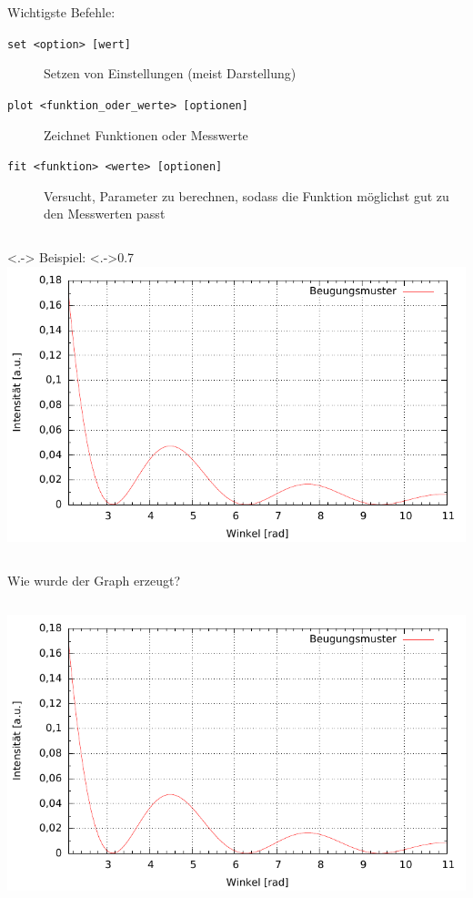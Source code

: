 \begin{frame}[<+->]
	Wichtigste Befehle:
	\begin{description}
		\item[\texttt{set <option> [wert]}] Setzen von Einstellungen (meist Darstellung)
		\item[\texttt{plot <funktion\_oder\_werte> [optionen]}] Zeichnet Funktionen oder Messwerte
		\item[\texttt{fit <funktion> <werte> [optionen]}] Versucht, Parameter zu berechnen, sodass die Funktion möglichst gut zu den Messwerten passt
	\end{description}

	\begin{columns}<.->
		Beispiel:
		\column<.->{0.7\textwidth}
		\includegraphics[width=\textwidth]{res/beispiel.pdf}
	\end{columns}
\end{frame}

\begin{frame}[<+->]
	Wie wurde der Graph erzeugt?

	\lstset{frame=L, numbers=left, xleftmargin=0.6cm}
	\lstset{language=Gnuplot, morekeywords=decimalsign}
	\begin{columns}
		
		\hspace*{-2.2cm}
		\includegraphics[width=1.6\textwidth]{res/beispiel.pdf}
		\vspace*{-2cm}
	\end{columns}
\end{frame}

